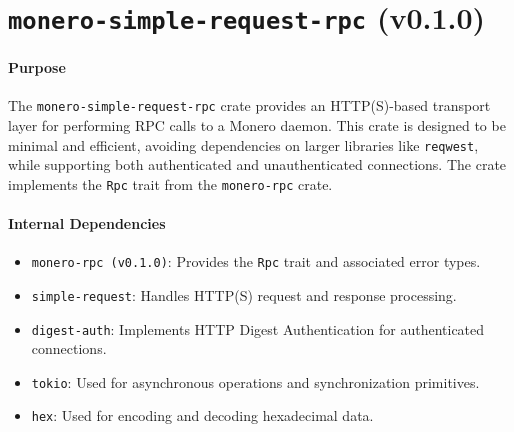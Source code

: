 \documentclass[12pt,a4paper]{article}
\begin{document}
\section{\texttt{monero-simple-request-rpc} (v0.1.0)}

\paragraph{Purpose}
The \texttt{monero-simple-request-rpc} crate provides an HTTP(S)-based transport layer for performing RPC calls to a Monero daemon.  This crate is designed to be minimal and efficient, avoiding dependencies on larger libraries like \texttt{reqwest}, while supporting both authenticated and unauthenticated connections.  The crate implements the \texttt{Rpc} trait from the \texttt{monero-rpc} crate.

\paragraph{Internal Dependencies}
\begin{itemize}
    \item \texttt{monero-rpc (v0.1.0)}: Provides the \texttt{Rpc} trait and associated error types.
    \item \texttt{simple-request}: Handles HTTP(S) request and response processing.
    \item \texttt{digest-auth}: Implements HTTP Digest Authentication for authenticated connections.
    \item \texttt{tokio}: Used for asynchronous operations and synchronization primitives.
    \item \texttt{hex}: Used for encoding and decoding hexadecimal data.
\end{itemize}
\end{document}
